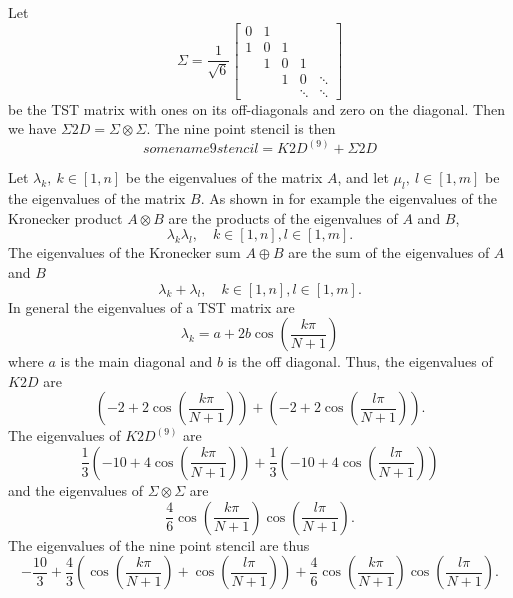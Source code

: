 Let
\begin{equation}
  \Sigma =
  \frac{1}{\sqrt{6}}
  \begin{bmatrix}
    0 & 1  \\
    1 & 0 & 1 \\
      & 1 & 0 & 1 \\
      &   & 1 & 0 & \ddots\\
      &   &   & \ddots  & \ddots
  \end{bmatrix}
\end{equation}
be the TST matrix with ones on its off-diagonals and zero on the diagonal.
Then we have $\Sigma 2D = \Sigma \otimes \Sigma$.
The nine point stencil is then
\begin{equation}
  somename9stencil = K2D^{(9)} + \Sigma 2D
\end{equation}

Let $\lambda_k, ~k\in[1, n]$ be the eigenvalues of the matrix $A$, and let $\mu_l, ~l\in [1, m]$ be the eigenvalues of the matrix $B$.
As shown in for example \cite{Laub_2004} the eigenvalues of the Kronecker product $A \otimes B$ are the products of the eigenvalues of $A$ and $B$,
$$
\lambda_k\lambda_l, \quad k \in [1, n], l\in [1,m].
$$
The eigenvalues of the Kronecker sum $A\oplus B$ are the sum of the eigenvalues of $A$ and $B$
$$
\lambda_k + \lambda_l, \quad k \in [1, n], l\in [1,m].
$$
In general the eigenvalues of a TST matrix are\cite{tridiagonal}
\begin{equation*}
	\lambda_k = a + 2 b \cos\left(\frac{k \pi}{N + 1}\right)
\end{equation*}
where $a$ is the main diagonal and $b$ is the off diagonal.
Thus, the eigenvalues of $K2D$ are
$$
\left(-2 + 2\cos\left(\frac{k \pi}{N + 1}\right)\right)
+
\left(-2 + 2\cos\left(\frac{l \pi}{N + 1}\right)\right).
$$
The eigenvalues of $K2D^{(9)}$ are
$$
\frac13\left(-10 + 4\cos\left(\frac{k \pi}{N + 1}\right)\right)
+
\frac13\left(-10 + 4\cos\left(\frac{l \pi}{N + 1}\right)\right)
$$
and the eigenvalues of $\Sigma \otimes \Sigma$ are
$$
\frac46
\cos\left(\frac{k \pi}{N+1}\right)
\cos\left(\frac{l \pi}{N+1}\right).
$$
The eigenvalues of the nine point stencil are thus
\begin{equation}
  -\frac{10}{3}
  + \frac43
  \left(
  \cos(\frac{k \pi}{N+1})
  + \cos(\frac{l \pi}{N+1})
  \right)
  +
  \frac46
  \cos(\frac{k \pi}{N+1})
  \cos(\frac{l \pi}{N+1}).
\end{equation}

